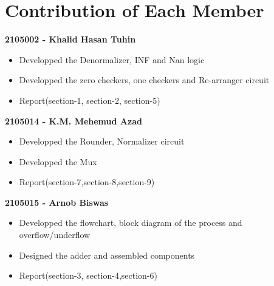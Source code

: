 \documentclass{article}
\begin{document}
\section{Contribution of Each Member} 
\textbf{2105002 - Khalid Hasan Tuhin} 
\begin{itemize}
    \item Developped the Denormalizer, INF and Nan logic 
    \item Developped the zero checkers, one checkers and Re-arranger circuit 
    \item Report(section-1, section-2, section-5)
\end{itemize} 
\textbf{2105014 - K.M. Mehemud Azad}
\begin{itemize}
    \item Developped the Rounder, Normalizer circuit 
    \item Developped the Mux 
    \item Report(section-7,section-8,section-9)
\end{itemize} 
\textbf{2105015 - Arnob Biswas} 
\begin{itemize}
    \item Developped the flowchart, block diagram of the process and overflow/underflow
    \item Designed the adder and assembled components 
    \item Report(section-3, section-4,section-6)
\end{itemize}
\end{document}
